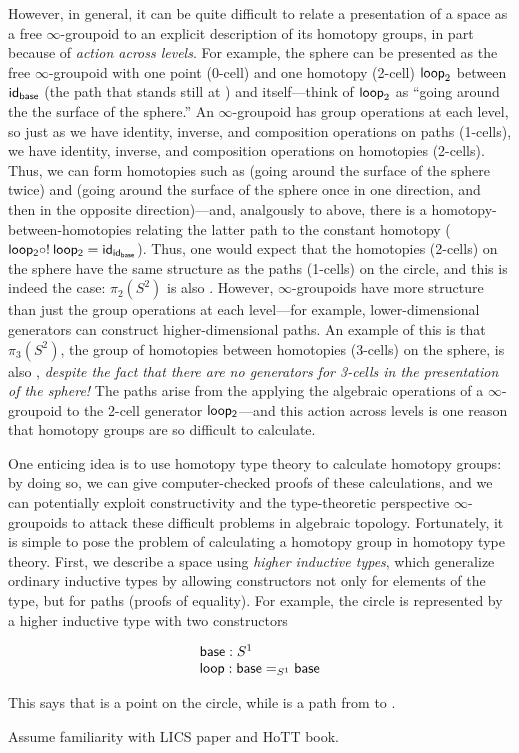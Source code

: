 However, in general, it can be quite difficult to relate a presentation
of a space as a free $\infty$-groupoid to an explicit description of its
homotopy groups, in part because of \emph{action across levels}.  For
example, the sphere can be presented as the free $\infty$-groupoid with
one point (0-cell)  and one homotopy (2-cell) $\mathsf{loop}_2$
between $\mathsf{id}_{{\mathsf{base}}}$ (the path that stands still at
) and itself---think of $\mathsf{loop}_2$ as ``going around the
the surface of the sphere.''  An $\infty$-groupoid has group operations
at each level, so just as we have identity, inverse, and composition
operations on paths (1-cells), we have identity, inverse, and
composition operations on homotopies (2-cells).  Thus, we can form
homotopies such as  \comp {} (going around the
surface of the sphere twice) and  \comp {}
(going around the surface of the sphere once in one direction, and then
in the opposite direction)---and, analgously to above, there is a
homotopy-between-homotopies relating the latter path to the constant
homotopy ($\mathsf{loop_2} \mathbin{\circ} ! \: \mathsf{loop_2} =
\mathsf{id}_{{\mathsf{id}_{\mathsf{base}}}}$).  Thus, one would expect that the
homotopies (2-cells) on the sphere have the same structure as the paths
(1-cells) on the circle, and this is indeed the case: $\pi_2(S^2)$ is
also \Z.  However, $\infty$-groupoids have more structure than just the
group operations at each level---for example, lower-dimensional
generators can construct higher-dimensional paths.  An example of this
is that $\pi_3(S^2)$, the group of homotopies between homotopies
(3-cells) on the sphere, is also \Z, \emph{despite the fact that there
  are no generators for 3-cells in the presentation of the sphere!}  The
paths arise from the applying the algebraic operations of a
$\infty$-groupoid to the 2-cell generator $\mathsf{loop_2}$---and this
action across levels is one reason that homotopy groups are so difficult
to calculate.  

One enticing idea is to use homotopy type theory to calculate homotopy
groups: by doing so, we can give computer-checked proofs of these
calculations, and we can potentially exploit constructivity and the
type-theoretic perspective $\infty$-groupoids to attack these difficult
problems in algebraic topology.  Fortunately, it is simple to pose the
problem of calculating a homotopy group in homotopy type theory.  First,
we describe a space using \emph{higher inductive types}, which
generalize ordinary inductive types by allowing constructors not only
for elements of the type, but for paths (proofs of equality).  For
example, the circle is represented by a higher inductive type with two
constructors

\[
\begin{array}{l}
\mathsf{base} : S^1 \\
\mathsf{loop} : \mathsf{base} =_{S^1} \mathsf{base} \\
\end{array}
\]

This says that  is a point on the circle, while  is
a path from  to .  




Assume familiarity with LICS paper and HoTT book.  


